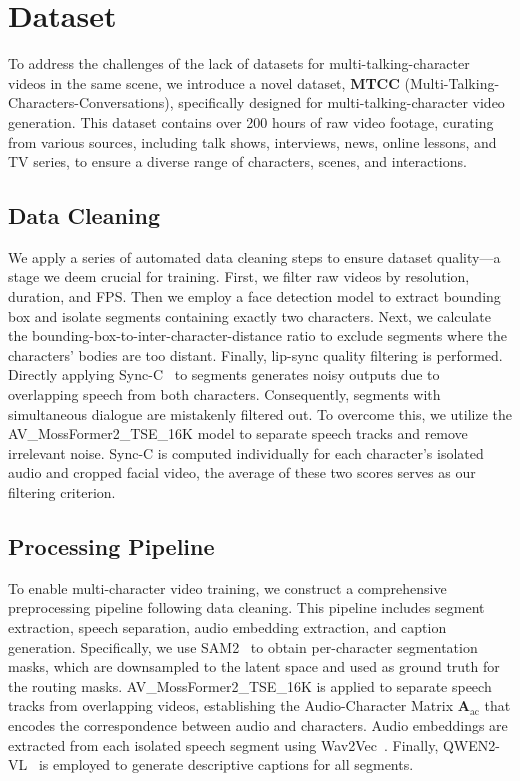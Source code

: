 \section{Dataset}
To address the challenges of the lack of datasets for multi-talking-character videos in the same scene, we introduce a novel dataset, \textbf{MTCC} (Multi-Talking-Characters-Conversations), specifically designed for multi-talking-character video generation. 
This dataset contains over 200 hours of raw video footage, curating from various sources, including talk shows, interviews, news, online lessons, and TV series, to ensure a diverse range of characters, scenes, and interactions.
\subsection{Data Cleaning}
We apply a series of automated data cleaning steps to ensure dataset quality—a stage we deem crucial for training. First, we filter raw videos by resolution, duration, and FPS. Then we employ a face detection model \cite{yolov8_ultralytics} to extract bounding box and isolate segments containing exactly two characters.
Next, we calculate the bounding-box-to-inter-character-distance ratio to exclude segments where the characters' bodies are too distant. Finally, lip-sync quality filtering is performed.
Directly applying Sync-C~\cite{chung2017out} to segments generates noisy outputs due to overlapping speech from both characters. Consequently, segments with simultaneous dialogue are mistakenly filtered out. To overcome this, we utilize the AV\_MossFormer2\_TSE\_16K model \cite{clearvoice_2025} to separate speech tracks and remove irrelevant noise. Sync-C is computed individually for each character's isolated audio and cropped facial video, the average of these two scores serves as our filtering criterion.
\subsection{Processing Pipeline}
To enable multi-character video training, we construct a comprehensive preprocessing pipeline following data cleaning. This pipeline includes segment extraction, speech separation, audio embedding extraction, and caption generation. Specifically, we use SAM2~\cite{ravi2024sam2} to obtain per-character segmentation masks, which are downsampled to the latent space and used as ground truth for the routing masks. AV\_MossFormer2\_TSE\_16K is applied to separate speech tracks from overlapping videos, establishing the Audio-Character Matrix $\mathbf{A}_{\text{ac}}$ that encodes the correspondence between audio and characters. Audio embeddings are extracted from each isolated speech segment using Wav2Vec~\cite{baevski2020wav2vec}. Finally, QWEN2-VL~\cite{bai2023qwen} is employed to generate descriptive captions for all segments.
